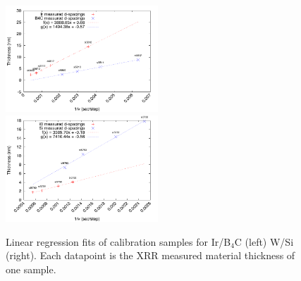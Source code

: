 \begin{figure}[!h]
	\center
	\includegraphics[height=4cm]{figures/chamber/calibration_plot-ir-b4c.pdf}
	\includegraphics[height=4cm]{figures/chamber/calibration_plot-w-si.pdf}
\caption{\footnotesize Linear regression fits of calibration samples for Ir/B$_4$C (left) W/Si (right). Each datapoint is the XRR measured material thickness of one sample.}\label{fig:calib-fit}
\end{figure}
